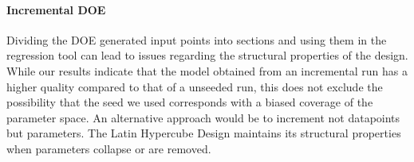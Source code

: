 %
%
\paragraph{Incremental DOE}
Dividing the DOE generated input points into sections and using them in the regression tool can lead to issues regarding the structural properties of the design. While our results indicate that the model obtained from an incremental run has a higher quality compared to that  of a unseeded run, this does not exclude the possibility that the seed we used corresponds with a biased coverage of the parameter space. An alternative approach would be to increment not datapoints but parameters. The Latin Hypercube Design maintains its structural properties when parameters collapse or are removed. 
